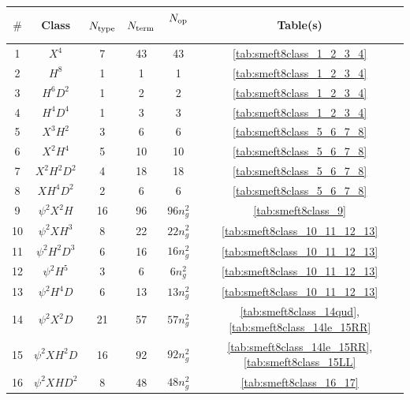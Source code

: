 \begin{table}[H]
\begin{center}
\renewcommand{\arraystretch}{1.2}
\begin{tabular}[t]{c | c | c | c | c | c}
$\#$ & Class & $N_{\rm type}$ & $N_{\rm term}$ & $N_{\rm op}$~\cite{Henning:2015alf} & Table(s) \\
\hline
1    & $X^4$                & 7 & 43 & 43    & \ref{tab:smeft8class_1_2_3_4} \\
2    & $H^8$                & 1  & 1   & 1       &  \ref{tab:smeft8class_1_2_3_4} \\
3    & $H^6D^2$          & 1  & 2   & 2     &  \ref{tab:smeft8class_1_2_3_4} \\
4    & $H^4D^4$           & 1  & 3   & 3    &  \ref{tab:smeft8class_1_2_3_4} \\
5    & $X^3H^2$          & 3  & 6   & 6       & \ref{tab:smeft8class_5_6_7_8} \\
6    & $X^2H^4$          & 5 & 10 & 10    & \ref{tab:smeft8class_5_6_7_8} \\
7    & $X^2H^2D^2$    & 4 & 18 & 18   & \ref{tab:smeft8class_5_6_7_8} \\
8    & $XH^4D^2$        &  2 & 6   & 6     & \ref{tab:smeft8class_5_6_7_8} \\ \hline
9    & $\psi^2X^2H$     & 16 & 96 & $96 n_g^2$ & \ref{tab:smeft8class_9} \\
10  & $\psi^2XH^3$     & 8 & 22 & $22 n_g^2$  &  \ref{tab:smeft8class_10_11_12_13} \\
11  & $\psi^2H^2D^3$  & 6 & 16 & $16 n_g^2$ &  \ref{tab:smeft8class_10_11_12_13} \\
12  & $\psi^2H^5$       & 3   & 6   & $6 n_g^2$    &  \ref{tab:smeft8class_10_11_12_13} \\
13  & $\psi^2H^4D$    & 6 & 13 & $13 n_g^2$  &  \ref{tab:smeft8class_10_11_12_13} \\
14  & $\psi^2X^2D$     & 21  & 57 & $57 n_g^2$  &  \ref{tab:smeft8class_14qud}, \ref{tab:smeft8class_14le_15RR} \\
15  & $\psi^2XH^2D$  & 16 & 92  & $92 n_g^2$ &  \ref{tab:smeft8class_14le_15RR}, \ref{tab:smeft8class_15LL} \\
16  & $\psi^2XHD^2$  & 8  & 48  & $48 n_g^2$ &  \ref{tab:smeft8class_16_17} \\

\end{tabular}
\end{center}
\end{table}
